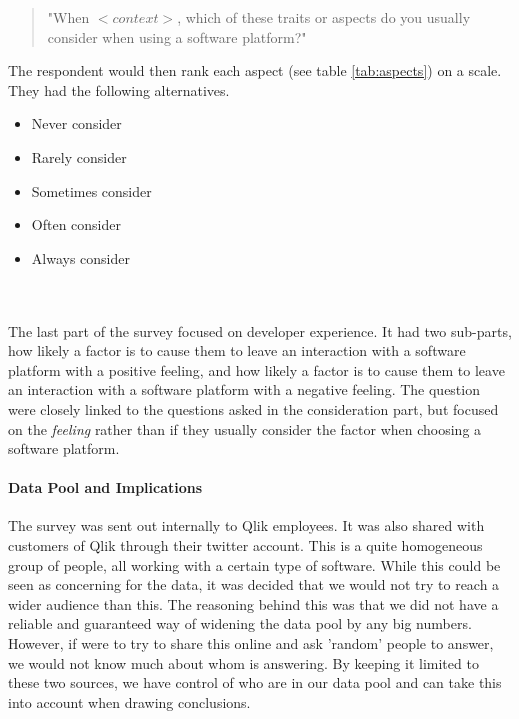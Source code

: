 \documentclass{article}
\begin{document}
\begin{quote}
"When $<context>$, which of these traits or aspects do you usually consider when using a software platform?"
\end{quote}
The respondent would then rank each aspect (see table \ref{tab:aspects}) on a scale. They had the following alternatives.
\begin{itemize}[label={-}]
\item Never consider
\item Rarely consider
\item Sometimes consider
\item Often consider
\item Always consider
\end{itemize}
\\ \\
The last part of the survey focused on developer experience. It had
two sub-parts, how likely a factor is to cause them to leave an
interaction with a software platform with a positive feeling, and how
likely a factor is to cause them to leave an interaction with a software
platform with a negative feeling. The question were closely linked to
the questions asked in the consideration part, but focused on the
\textit{feeling} rather than if they usually consider the factor when choosing
a software platform.

\paragraph{Data Pool and Implications}
The survey was sent out internally to Qlik employees. It was also shared with customers of Qlik through their twitter account. This is a quite homogeneous group of people, all working with a certain type of software. While this could be seen as concerning for the data, it was decided that we would not try to reach a wider audience than this. The reasoning behind this was that we did not have a reliable and guaranteed way of widening the data pool by any big numbers. However, if were to try to share this online and ask 'random' people to answer, we would not know much about whom is answering. By keeping it limited to these two sources, we have control of who are in our data pool and can take this into account when drawing conclusions.
\end{document}
